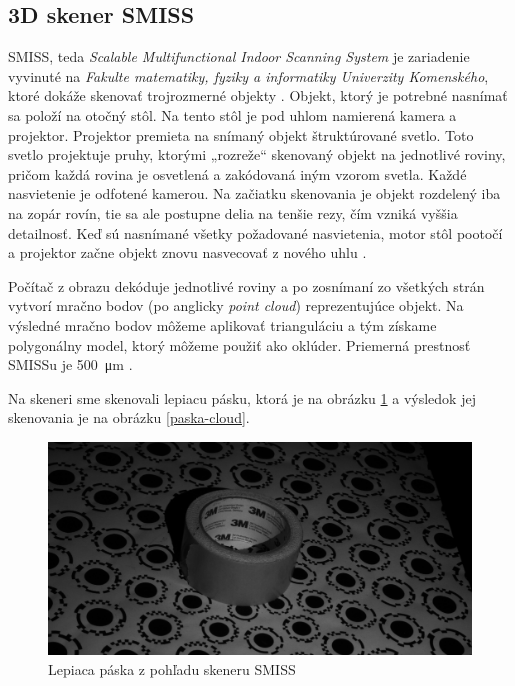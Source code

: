 \subsection{3D skener SMISS}

SMISS, teda \emph{Scalable Multifunctional Indoor Scanning System} je zariadenie vyvinuté na \emph{Fakulte matematiky, fyziky a informatiky Univerzity Komenského}, ktoré dokáže skenovať trojrozmerné objekty \cite{Kovacovsky13}. Objekt, ktorý je potrebné nasnímať sa položí na otočný stôl. Na tento stôl je pod uhlom namierená kamera a projektor. Projektor premieta na snímaný objekt štruktúrované svetlo. Toto svetlo projektuje pruhy, ktorými „rozreže“ skenovaný objekt na jednotlivé roviny, pričom každá rovina je osvetlená a zakódovaná iným vzorom svetla. Každé nasvietenie je odfotené kamerou. Na začiatku skenovania je objekt rozdelený iba na zopár rovín, tie sa ale postupne delia na tenšie rezy, čím vzniká vyššia detailnosť. Keď sú nasnímané všetky požadované nasvietenia, motor stôl pootočí a projektor začne objekt znovu nasvecovať z nového uhlu \cite{Kovacovsky12-a, Kovacovsky12-b}.

Počítač z obrazu dekóduje jednotlivé roviny a po zosnímaní zo všetkých strán vytvorí mračno bodov (po anglicky \emph{point cloud}) reprezentujúce objekt. Na výsledné mračno bodov môžeme aplikovať trianguláciu a tým získame polygonálny model, ktorý môžeme použiť ako oklúder. Priemerná prestnosť SMISSu je \SI{500}{\micro\metre} \cite{Kovacovsky12-b}.

Na skeneri sme skenovali lepiacu pásku, ktorá je na obrázku \ref{paska} a výsledok jej skenovania je na obrázku \ref{paska-cloud}.

\begin{figure}[h]
 \centering
 \includegraphics[max width=\textwidth]{pictures/smiss.png}
 \caption{Lepiaca páska z pohľadu skeneru SMISS}
 \label{paska}
 \end{figure}

